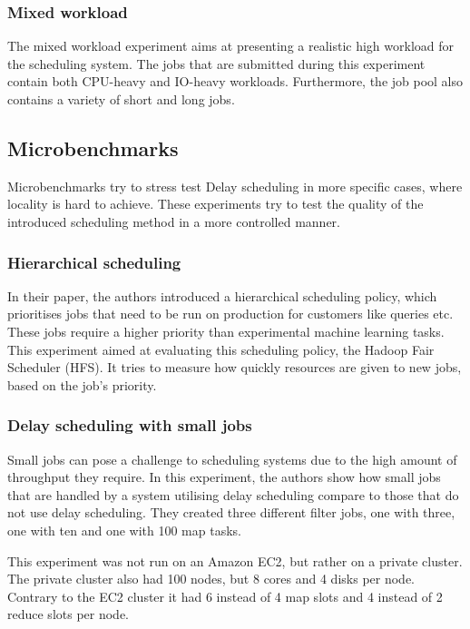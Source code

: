 \subsubsection{Mixed workload}

The mixed workload experiment aims at presenting a realistic high workload for the scheduling system. The jobs that are submitted during this experiment contain both CPU-heavy and IO-heavy workloads. Furthermore, the job pool also contains a variety of short and long jobs.

\subsection{Microbenchmarks}

Microbenchmarks try to stress test Delay scheduling in more specific cases, where locality is hard to achieve. These experiments try to test the quality of the introduced scheduling method in a more controlled manner.

\subsubsection{Hierarchical scheduling}

In their paper, the authors introduced a hierarchical scheduling policy, which prioritises jobs that need to be run on production for customers like queries etc. These jobs require a higher priority than experimental machine learning tasks. This experiment aimed at evaluating this scheduling policy, the Hadoop Fair Scheduler (HFS). It tries to measure how quickly resources are given to new jobs, based on the job's priority.

\subsubsection{Delay scheduling with small jobs}

Small jobs can pose a challenge to scheduling systems due to the high amount of throughput they require. In this experiment, the authors show how small jobs that are handled by a system utilising delay scheduling compare to those that do not use delay scheduling. They created three different filter jobs, one with three, one with ten and one with 100 map tasks.

This experiment was not run on an Amazon EC2, but rather on a private cluster. The private cluster also had 100 nodes, but 8 cores and 4 disks per node. Contrary to the EC2 cluster it had 6 instead of 4 map slots and 4 instead of 2 reduce slots per node.

